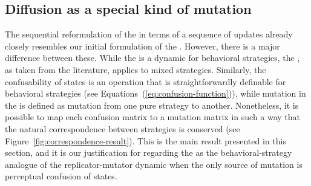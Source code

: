 \subsection{Diffusion as a special kind of mutation}

The sequential reformulation of the \rmd in terms of a sequence of
updates already closely resembles our initial formulation of the
\rdd. However, there is a major difference between these. While the
\rdd is a dynamic for behavioral strategies, the \rmd, as taken from
the literature, applies to mixed strategies. Similarly, the
confusability of states is an operation that is straightforwardly
definable for behavioral strategies (see
Equations~(\ref{eq:confusion-function})), while mutation in the \rmd is
defined as mutation from one pure strategy to another. Nonetheless, it
is possible to map each confusion matrix to a mutation matrix in such
a way that the natural correspondence between strategies is conserved
(see Figure~\ref{fig:correspondence-result}). This is the main result
presented in this section, and it is our justification for regarding
the \rdd as the behavioral-strategy analogue of the replicator-mutator
dynamic when the only source of mutation is perceptual confusion of
states.

